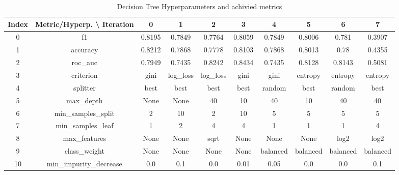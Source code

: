 \documentclass{article}%
\begin{document}
\begin{table}[h!]%
\caption{Decision Tree Hyperparameters and achivied metrics}%
\vspace{0.2cm}%
\centering%
\begin{tabular}{|c||c||c||c||c||c||c||c||c||c|}%
\hline%
Index&Metric/Hyperp. \textbackslash{} Iteration&0&1&2&3&4&5&6&7\\%
\hline%
0&f1&0.8195&0.7849&0.7764&0.8059&0.7849&0.8006&0.781&0.3907\\%
1&accuracy&0.8212&0.7868&0.7778&0.8103&0.7868&0.8013&0.78&0.4355\\%
2&roc\_auc&0.7949&0.7435&0.8242&0.8434&0.7435&0.8128&0.8143&0.5081\\%
3&criterion&gini&log\_loss&log\_loss&gini&gini&entropy&entropy&entropy\\%
4&splitter&best&best&best&best&random&best&random&best\\%
5&max\_depth&None&None&40&10&40&10&40&40\\%
6&min\_samples\_split&2&10&2&10&5&5&5&5\\%
7&min\_samples\_leaf&1&2&4&4&1&1&1&4\\%
8&max\_features&None&None&sqrt&None&None&None&log2&log2\\%
9&class\_weight&None&None&None&None&balanced&balanced&balanced&balanced\\%
10&min\_impurity\_decrease&0.0&0.1&0.0&0.01&0.05&0.0&0.0&0.1\\%
\hline%
\end{tabular}%
\end{table}

%
\end{document}
